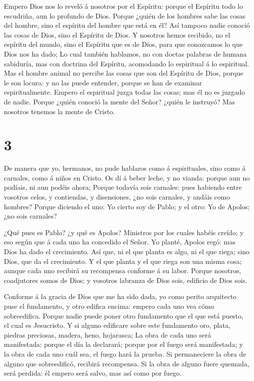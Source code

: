  Empero Dios nos lo reveló á nosotros por el Espíritu:
porque el Espíritu todo lo escudriña, aun lo profundo de Dios.
 Porque ¿quién de los hombres sabe las cosas del hombre,
sino el espíritu del hombre que está en él? Así tampoco nadie conoció
las cosas de Dios, sino el Espíritu de Dios.  Y nosotros
hemos recibido, no el espíritu del mundo, sino el Espíritu que es de
Dios, para que conozcamos lo que Dios nos ha dado;  Lo cual
también hablamos, no con doctas palabras de humana sabiduría, mas con
doctrina del Espíritu, acomodando lo espiritual á lo espiritual.
 Mas el hombre animal no percibe las cosas que son del
Espíritu de Dios, porque le son locura: y no las puede entender, porque
se han de examinar espiritualmente.  Empero el espiritual
juzga todas las cosas; mas él no es juzgado de nadie. 
Porque ¿quién conoció la mente del Señor? ¿quién le instruyó? Mas
nosotros tenemos la mente de Cristo.

\hypertarget{section-2}{%
\section{3}\label{section-2}}

 De manera que yo, hermanos, no pude hablaros como á
espirituales, sino como á carnales, como á niños en Cristo. 
Os dí á beber leche, y no vianda: porque aun no podíais, ni aun podéis
ahora;  Porque todavía sois carnales: pues habiendo entre
vosotros celos, y contiendas, y disensiones, ¿no sois carnales, y andáis
como hombres?  Porque diciendo el uno: Yo cierto soy de
Pablo; y el otro: Yo de Apolos; ¿no sois carnales?

 ¿Qué pues es Pablo? ¿y qué es Apolos? Ministros por los
cuales habéis creído; y eso según que á cada uno ha concedido el Señor.
 Yo planté, Apolos regó: mas Dios ha dado el crecimiento.
 Así que, ni el que planta es algo, ni el que riega; sino
Dios, que da el crecimiento.  Y el que planta y el que riega
son una misma cosa; aunque cada uno recibirá su recompensa conforme á su
labor.  Porque nosotros, coadjutores somos de Dios; y
vosotros labranza de Dios sois, edificio de Dios sois.

 Conforme á la gracia de Dios que me ha sido dada, yo como
perito arquitecto puse el fundamento, y otro edifica encima: empero cada
uno vea cómo sobreedifica.  Porque nadie puede poner otro
fundamento que el que está puesto, el cual es Jesucristo. 
Y si alguno edificare sobre este fundamento oro, plata, piedras
preciosas, madera, heno, hojarasca;  La obra de cada uno
será manifestada: porque el día la declarará; porque por el fuego será
manifestada; y la obra de cada uno cuál sea, el fuego hará la prueba.
 Si permaneciere la obra de alguno que sobreedificó,
recibirá recompensa.  Si la obra de alguno fuere quemada,
será perdida: él empero será salvo, mas así como por fuego.

